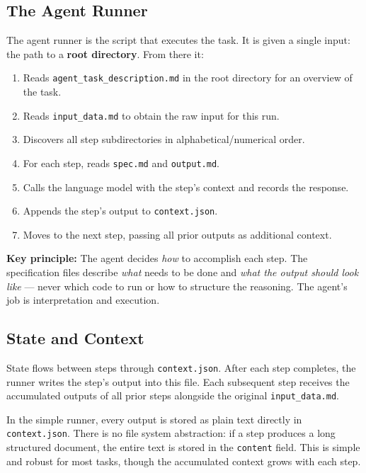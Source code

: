 \documentclass[12pt, a4paper]{article}
\begin{document}
\subsection{The Agent Runner}

The agent runner is the script that executes the task. It is given a single input: the path to a \textbf{root directory}. From there it:

\begin{enumerate}[leftmargin=1.5em]
  \item Reads \texttt{agent\_task\_description.md} in the root directory for an overview of the task.
  \item Reads \texttt{input\_data.md} to obtain the raw input for this run.
  \item Discovers all step subdirectories in alphabetical/numerical order.
  \item For each step, reads \texttt{spec.md} and \texttt{output.md}.
  \item Calls the language model with the step's context and records the response.
  \item Appends the step's output to \texttt{context.json}.
  \item Moves to the next step, passing all prior outputs as additional context.
\end{enumerate}

\begin{notebox}
\textbf{Key principle:} The agent decides \textit{how} to accomplish each step. The specification files describe \textit{what} needs to be done and \textit{what the output should look like} --- never which code to run or how to structure the reasoning. The agent's job is interpretation and execution.
\end{notebox}

\subsection{State and Context}

State flows between steps through \texttt{context.json}. After each step completes, the runner writes the step's output into this file. Each subsequent step receives the accumulated outputs of all prior steps alongside the original \texttt{input\_data.md}.

In the simple runner, every output is stored as plain text directly in \texttt{context.json}. There is no file system abstraction: if a step produces a long structured document, the entire text is stored in the \texttt{content} field. This is simple and robust for most tasks, though the accumulated context grows with each step.
\end{document}
